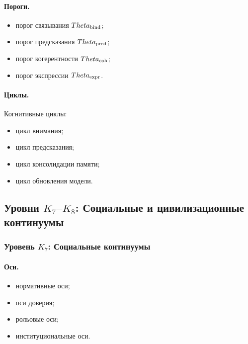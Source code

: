\paragraph{Пороги.}
\begin{itemize}
    \item порог связывания \(\Theta_{\rm bind}\);
    \item порог предсказания \(\Theta_{\rm pred}\);
    \item порог когерентности \(\Theta_{\rm coh}\);
    \item порог экспрессии \(\Theta_{\rm expr}\).
\end{itemize}

\paragraph{Циклы.}
Когнитивные циклы:
\begin{itemize}
    \item цикл внимания;
    \item цикл предсказания;
    \item цикл консолидации памяти;
    \item цикл обновления модели.
\end{itemize}


\subsection{Уровни \texorpdfstring{\texorpdfstring{$K_7$}{K\_7}–\texorpdfstring{$K_8$}{K\_8}}{K7–K8}: Социальные и цивилизационные континуумы}

\subsubsection{Уровень \texorpdfstring{\(K_7\)}{K7}: Социальные континуумы}

\paragraph{Оси.}
\begin{itemize}
    \item нормативные оси;
    \item оси доверия;
    \item рольовые оси;
    \item институциональные оси.
\end{itemize}

